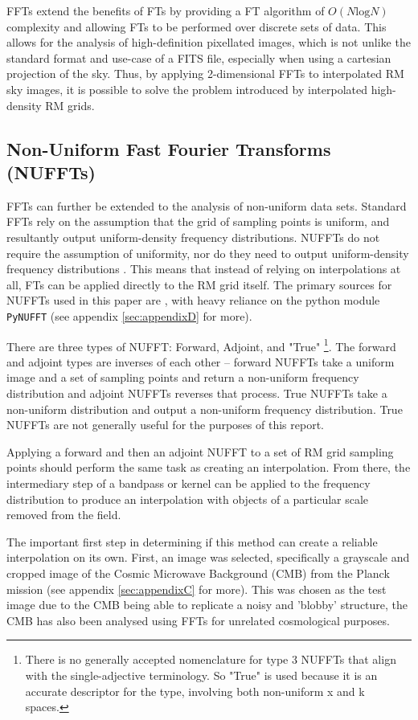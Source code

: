 FFTs extend the benefits of FTs by providing a FT algorithm of $O(N\mathrm{log}N)$ complexity and allowing FTs to be performed over discrete sets of data. This allows for the analysis of high-definition pixellated images, which is not unlike the standard format and use-case of a FITS file, especially when using a cartesian projection of the sky. Thus, by applying 2-dimensional FFTs to interpolated RM sky images, it is possible to solve the problem introduced by interpolated high-density RM grids.

\subsection{Non-Uniform Fast Fourier Transforms (NUFFTs)}
\label{ssec:nuffts}

FFTs can further be extended to the analysis of non-uniform data sets. Standard FFTs rely on the assumption that the grid of sampling points is uniform, and resultantly output uniform-density frequency distributions. NUFFTs do not require the assumption of uniformity, nor do they need to output uniform-density frequency distributions \citep{ID55, ID57}. This means that instead of relying on interpolations at all, FTs can be applied directly to the RM grid itself. The primary sources for NUFFTs used in this paper are \cite{ID55, ID57}, with heavy reliance on the python module \verb|PyNUFFT| (see appendix \ref{sec:appendixD} for more).


There are three types of NUFFT: Forward, Adjoint, and "True" \footnote{There is no generally accepted nomenclature for type 3 NUFFTs that align with the single-adjective terminology. So "True" is used because it is an accurate descriptor for the type, involving both non-uniform x and k spaces.}. The forward and adjoint types are inverses of each other – forward NUFFTs take a uniform image and a set of sampling points and return a non-uniform frequency distribution and adjoint NUFFTs reverses that process. True NUFFTs take a non-uniform distribution and output a non-uniform frequency distribution. True NUFFTs are not generally useful for the purposes of this report.


Applying a forward and then an adjoint NUFFT to a set of RM grid sampling points should perform the same task as creating an interpolation. From there, the intermediary step of a bandpass or kernel can be applied to the frequency distribution to produce an interpolation with objects of a particular scale removed from the field.


The important first step in determining if this method can create a reliable interpolation on its own. First, an image was selected, specifically a grayscale and cropped image of the Cosmic Microwave Background (CMB) from the Planck mission (see appendix \ref{sec:appendixC} for more). This was chosen as the test image due to the CMB being able to replicate a noisy and 'blobby' structure, the CMB has also been analysed using FFTs for unrelated cosmological purposes.


